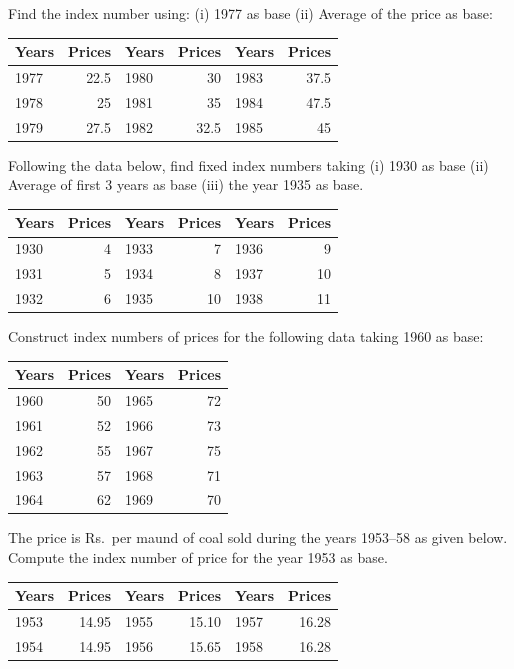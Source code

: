 \documentclass[11pt,a4paper]{article}
\begin{document}
\begin{longlist}
\item Find the index number using: (i) 1977 as base (ii) Average of the price as base:
\begin{center}
\begin{tabular}{l r l r l r}
\toprule
Years & Prices & Years & Prices & Years & Prices \\
\midrule
1977 & 22.5 & 1980 & 30 & 1983 & 37.5 \\
1978 & 25 & 1981 & 35 & 1984 & 47.5 \\
1979 & 27.5 & 1982 & 32.5 & 1985 & 45 \\
\bottomrule
\end{tabular}
\end{center}

\item Following the data below, find fixed index numbers taking (i) 1930 as base (ii) Average of first 3 years as base (iii) the year 1935 as base.
\begin{center}
\begin{tabular}{l r l r l r}
\toprule
Years & Prices & Years & Prices & Years & Prices \\
\midrule
1930 & 4 & 1933 & 7 & 1936 & 9 \\
1931 & 5 & 1934 & 8 & 1937 & 10 \\
1932 & 6 & 1935 & 10 & 1938 & 11 \\
\bottomrule
\end{tabular}
\end{center}

\item Construct index numbers of prices for the following data taking 1960 as base:
\begin{center}
\begin{tabular}{l r l r}
\toprule
Years & Prices & Years & Prices \\
\midrule
1960 & 50 & 1965 & 72 \\
1961 & 52 & 1966 & 73 \\
1962 & 55 & 1967 & 75 \\
1963 & 57 & 1968 & 71 \\
1964 & 62 & 1969 & 70 \\
\bottomrule
\end{tabular}
\end{center}

\item The price is Rs.\ per maund of coal sold during the years 1953--58 as given below. Compute the index number of price for the year 1953 as base.
\begin{center}
\begin{tabular}{l r l r l r}
\toprule
Years & Prices & Years & Prices & Years & Prices \\
\midrule
1953 & 14.95 & 1955 & 15.10 & 1957 & 16.28 \\
1954 & 14.95 & 1956 & 15.65 & 1958 & 16.28 \\
\bottomrule
\end{tabular}
\end{center}


\end{longlist}
\end{document}
